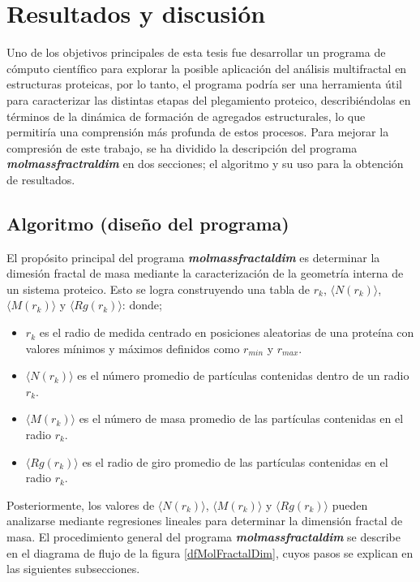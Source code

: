 \chapter{Resultados y discusión}

Uno de los objetivos principales de esta tesis fue desarrollar un programa de cómputo científico para explorar la posible aplicación del análisis multifractal en estructuras proteicas, por lo tanto, el programa podría ser una herramienta útil para caracterizar las distintas etapas del plegamiento proteico, describiéndolas en términos de la dinámica de formación de agregados estructurales, lo que permitiría una comprensión más profunda de estos procesos. Para mejorar la compresión de este trabajo, se ha dividido la descripción del programa \textit{\textbf{molmassfractraldim}} en dos secciones; el algoritmo y su uso para la obtención de resultados. 
 
 
\section{Algoritmo (diseño del programa)}

El propósito principal del programa \textbf{\textit{molmassfractaldim}} es determinar la dimesi\'{o}n fractal de masa mediante la caracterizaci\'{o}n de la geometría interna de un sistema proteico. Esto se logra construyendo una tabla de $r_{k}$, $\langle N(r_k) \rangle$, $\langle M(r_k) \rangle$ y $\langle Rg(r_k) \rangle$: donde;

\begin{itemize}
	\item $r_{k}$ es el radio de medida centrado en posiciones aleatorias de una prote\'{i}na con valores m\'{i}nimos y m\'{a}ximos definidos como $r_{min}$ y $r_{max}$.
	\item $\langle N(r_k) \rangle$ es el número promedio de partículas contenidas dentro de un radio $r_{k}$. 
	\item  $\langle M(r_k) \rangle$ es el n\'{u}mero de masa promedio de las part\'{i}culas contenidas en el radio $r_{k}$.
	\item  $\langle Rg(r_k) \rangle$ es el radio de giro promedio de las part\'{i}culas contenidas en el radio $r_{k}$.
\end{itemize}

Posteriormente, los valores de $\langle N(r_k) \rangle$, $\langle M(r_k) \rangle$ y $\langle Rg(r_k) \rangle$ pueden analizarse mediante regresiones lineales para determinar la dimensi\'{o}n fractal de masa. El procedimiento general del programa \textbf{\textit{molmassfractaldim}} se describe en el diagrama de flujo de la figura \ref{dfMolFractalDim}, cuyos pasos se explican en las siguientes subsecciones.
 
